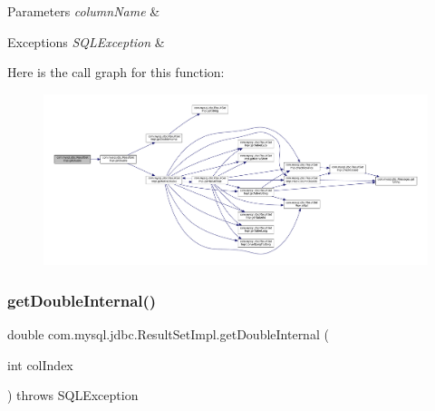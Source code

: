 \begin{DoxyParams}{Parameters}
{\em column\+Name} & \\
\hline
\end{DoxyParams}

\begin{DoxyExceptions}{Exceptions}
{\em S\+Q\+L\+Exception} & \\
\hline
\end{DoxyExceptions}
Here is the call graph for this function\+:
\nopagebreak
\begin{figure}[H]
\begin{center}
\leavevmode
\includegraphics[width=350pt]{classcom_1_1mysql_1_1jdbc_1_1_result_set_impl_a301509f3aef1860590c3e7ee656d5142_cgraph}
\end{center}
\end{figure}
\mbox{\label{classcom_1_1mysql_1_1jdbc_1_1_result_set_impl_a23dad19b24da58f74652e22ac3fb4283}} 
\subsubsection{\texorpdfstring{get\+Double\+Internal()}{getDoubleInternal()}\hspace{0.1cm}{\footnotesize\ttfamily [1/2]}}
{\footnotesize\ttfamily double com.\+mysql.\+jdbc.\+Result\+Set\+Impl.\+get\+Double\+Internal (\begin{DoxyParamCaption}\item[{int}]{col\+Index }\end{DoxyParamCaption}) throws S\+Q\+L\+Exception\hspace{0.3cm}{\ttfamily [protected]}}

